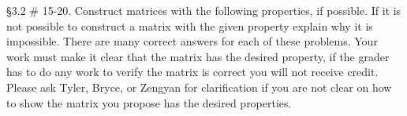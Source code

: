 \question \S 3.2 \# 15-20. Construct matrices with the following properties, if possible. If it is not possible to construct a matrix with the given property explain why it is impossible. There are many correct answers for each of these problems. Your work must make it clear that the matrix has the desired property, if the grader has to do any work to verify the matrix is correct you will not receive credit. Please ask Tyler, Bryce, or Zengyan for clarification if you are not clear on how to show the matrix you propose has the desired properties.
	
	
